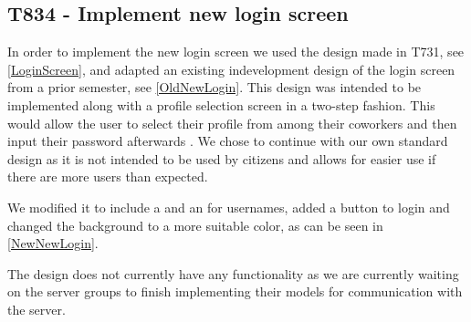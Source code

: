 \subsection{T834 - Implement new login screen}
In order to implement the new login screen we used the design made in T731,
see \autoref{LoginScreen}, and adapted an existing indevelopment design of
the login screen from a prior semester, see \autoref{OldNewLogin}. This design
was intended to be implemented along with a profile selection screen in
a two-step fashion. This would allow the user to select their profile from
among their coworkers and then input their password afterwards \citep[Ch.9.5,
p.68-70]{RestLogin}. We chose to continue with our own standard design as it is
not intended to be used by citizens and allows for easier use if there are
more users than expected.


We modified it to include a  and an  for
usernames, added a button to login and changed the background to a more suitable
color, as can be seen in \autoref{NewNewLogin}.


The design does not currently have any functionality as we are currently waiting
on the server groups to finish implementing their models for communication with
the server.

